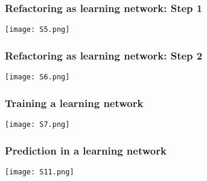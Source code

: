 \documentclass[t]{beamer}
\newcommand\df{\bf\color{Maroon}}
\begin{document}
\begin{frame}
  \frametitle{Refactoring as {\df learning network}: Step 1}
    \begin{center}
    \texttt{[image: S5.png]}
  \end{center}
\end{frame}

\begin{frame}
  \frametitle{Refactoring as {\df learning network}: Step 2}
  \vspace{-0.4\baselineskip}
    \begin{center}
    \texttt{[image: S6.png]}
  \end{center}
\end{frame}

\begin{frame}
  \frametitle{{\df Training} a learning network}
    \begin{center}
    \texttt{[image: S7.png]}
  \end{center}
\end{frame}


\begin{frame}
  \frametitle{{\df Prediction} in a learning network}
    \begin{center}
    \texttt{[image: S11.png]}
  \end{center}
\end{frame}


\end{document}
